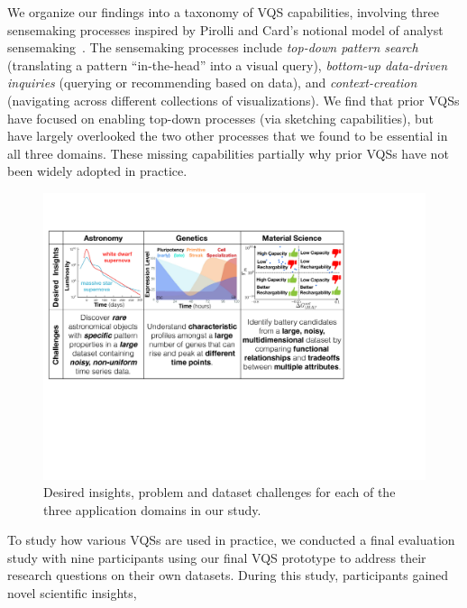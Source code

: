  \par We organize our  findings into a taxonomy of VQS capabilities, involving three sensemaking processes inspired by Pirolli and Card's notional model of analyst sensemaking~\cite{Pirolli}. The sensemaking processes include \emph{top-down pattern search} (translating a pattern ``in-the-head'' into a visual query), \emph{bottom-up data-driven inquiries} (querying or recommending based on data), and \emph{context-creation} (navigating across different collections of visualizations). We find that prior VQSs have focused on enabling top-down processes (via sketching capabilities), but have largely overlooked the two other processes that we found to be essential in all three domains. These missing capabilities partially  why prior VQSs have not been widely adopted in practice.
 \begin{figure}[ht!]
  \centering
  \includegraphics[width=\linewidth]{figures/science_goal.pdf}
  \caption{Desired insights, problem and dataset challenges for each of the three application domains in our study.}
  \label{science_goal}
  \vspace*{-20pt}
 \end{figure}
 \par To study how various VQSs are used in practice, we conducted a final evaluation study with nine participants using our final VQS prototype to address their research questions on their own datasets. During this study, participants gained novel scientific insights,
